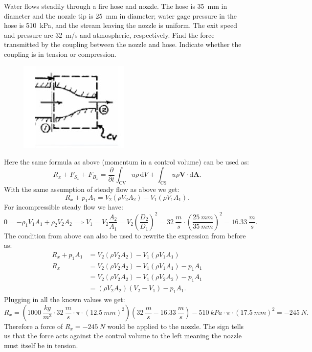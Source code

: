 Water flows steadily through a fire hose and nozzle. The hose is \qty{35}{mm} in diameter and the nozzle tip is \qty{25}{mm} in diameter; water gage pressure in the hose is \qty{510}{kPa}, and the stream leaving the nozzle is uniform. The exit speed and pressure are \qty{32}{m/s} and atmospheric, respectively. Find the force transmitted by the coupling between the nozzle and hose. Indicate whether the coupling is in tension or compression. 

\begin{figure} [ht]
  \centering
  \includegraphics[width=0.25\linewidth]{./figures/e4_16.png}
\end{figure}
\bigbreak
Here the same formula as above (momentum in a control volume) can be used as:
\[ 
R_x + F_{S_x} + F_{B_x} = \frac{\partial }{\partial t} \int_{\mathrm{CV}} u \rho \, \mathrm{d}V + \int_{\mathrm{CS}} u \rho \textbf{V} \cdot \mathrm{d}\textbf{A}
.\]
With the same assumption of steady flow as above we get:
\[ 
R_x + p_1 A_1 = V_2 \left( \rho V_2 A_2 \right) - V_1 \left( \rho V_1 A_1 \right)
.\]
For incompressible steady flow we have:
\[ 
  0 = - \rho_1 V_1 A_1 + \rho_2 V_2 A_2 \implies V_1 = V_2 \frac{A_2}{A_1} = V_2 \left( \frac{D_2}{D_1} \right)^2 = \qty{32}{\frac{m}{s}} \cdot \left( \frac{\qty{25}{mm} }{\qty{35}{mm} } \right)^2 = \qty{16,33}{\frac{m}{s}} 
.\]
The condition from above can also be used to rewrite the expression from before as:
\begin{align*}
  R_x + p_1 A_1 &= V_2 \left( \rho V_2 A_2 \right) - V_1 \left( \rho V_1 A_1 \right) \\
  R_x &= V_2 \left( \rho V_2 A_2 \right) - V_1 \left( \rho V_1 A_1 \right) - p_1 A_1 \\
  &= V_2 \left( \rho V_2 A_2 \right) - V_1 \left( \rho V_2 A_2 \right) - p_1 A_1 \\
  &= \left( \rho V_2 A_2 \right) \left( V_2 - V_1 \right) - p_1 A_1
.\end{align*}
Plugging in all the known values we get:
\[ 
R_x = \left( \qty{1000}{\frac{kg}{m^3}} \cdot \qty{32}{\frac{m}{s}} \cdot \pi \cdot \left( \qty{12,5}{mm}  \right)^2 \right) \left( \qty{32}{\frac{m}{s}} - \qty{16,33}{\frac{m}{s}}  \right) - \qty{510}{kPa} \cdot \pi \cdot \left( \qty{17,5}{mm}  \right)^2 = - \qty{245}{N}
.\]
Therefore a force of $R_x = - \qty{245}{N}$ would be applied to the nozzle. The sign tells us that the force acts against the control volume to the left meaning the nozzle must itself be in tension.


